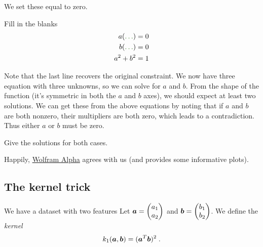\documentclass[11pt]{article}
\begin{document}
We set these equal to zero. 

\qu Fill in the blanks
\begin{align}
a (\ans{2+2\lambda}{\ldots})&= 0\\
b (\ans{4 + 2\lambda}{\ldots})&= 0 \\
a^2 + b^2 &= 1 \label{line:constraint}
\end{align}

Note that the last line recovers the original constraint. We now have three equation with three unknowns, so we can solve for $a$ and $b$. From the shape of the function (it's symmetric in both the $a$ and $b$ axes), we should expect at least two solutions. We can get these from the above equations by noting that if $a$ and $b$ are both nonzero, their multipliers are both zero, which leads to a contradiction. Thus either $a$ or $b$ must be zero.

\qu Give the solutions for both cases.


Happily, \href{https://goo.gl/Uaz5mg}{Wolfram Alpha} agrees with us (and provides some informative plots).


\subsection{The kernel trick}

We have a dataset with two features Let $\bm{a} = \begin{pmatrix}a_1\\ a_2\end{pmatrix}$ and $\bm{b} = \begin{pmatrix}b_1\\ b_2\end{pmatrix}$. We define the \emph{kernel}
\[
k_1(\bm{a}, \bm{b}) = (\bm{a}^T\bm{b})^2 \;\text{.}
\]
\end{document}
